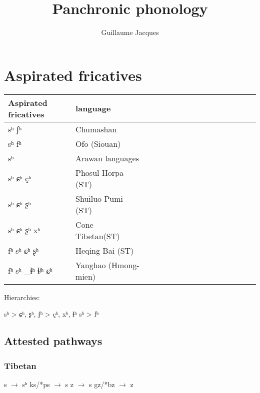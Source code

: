 \documentclass[oldfontcommands,oneside,a4paper,11pt]{article}
\begin{document}
 
\linenumbers
\title{Panchronic phonology}
\author{Guillaume Jacques}
\maketitle
\section{Aspirated fricatives}
\citet{jacques11lingua}

\citet{carveth13aspirated}
\citet{carveth13aspirated}

\begin{table}[H] \centering
\begin{tabular}{llllllllllllllll}
\toprule
Aspirated fricatives & language \\
\midrule
sʰ ʃʰ & Chumashan \\
sʰ fʰ & Ofo (Siouan) \\
sʰ & Arawan languages  \\
sʰ ɕʰ çʰ & Phosul Horpa (ST) \\
sʰ ɕʰ ʂʰ & Shuiluo Pumi (ST) \\
sʰ ɕʰ ʂʰ xʰ & Cone Tibetan(ST)  \\
fʰ sʰ ɕʰ ʂʰ   & Heqing Bai (ST) \\
fʰ sʰ _ɬʰ ɬʲʰ ɕʰ   & Yanghao (Hmong-mien) \\
\bottomrule
\end{tabular}

Hierarchies:

\begin{exe}
\ex 
\glt sʰ > {ɕʰ, ʂʰ, ʃʰ} > {çʰ, xʰ, ɬʰ}
\glt sʰ > fʰ
\end{exe}
\end{table}

\citet{dixon04arawa}
\citet{dienst05kulina}

\subsection{Attested pathways}

\subsubsection{Tibetan}
\begin{exe}
\ex 
\glt *s $\rightarrow$ sʰ
\glt *ks/*ps $\rightarrow$ s
\glt *z $\rightarrow$ s
\glt *gz/*bz $\rightarrow$ z
\end{exe}




\end{document}

